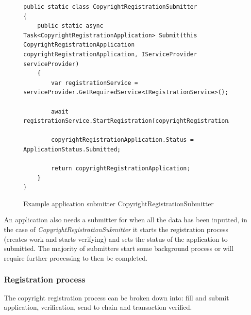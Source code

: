\begin{figure}[H]
\caption{Example application submitter \href{https://github.com/MrHarrisonBarker/CRPL/blob/main/CRPL.Web/Core/Applications/Submitters/CopyrightRegistrationSubmitter.cs}{CopyrightRegistrationSubmitter}}
\centering
\begin{lstlisting}[language=CSharp]
public static class CopyrightRegistrationSubmitter
{
    public static async Task<CopyrightRegistrationApplication> Submit(this CopyrightRegistrationApplication copyrightRegistrationApplication, IServiceProvider serviceProvider)
    {
        var registrationService = serviceProvider.GetRequiredService<IRegistrationService>();
        
        await registrationService.StartRegistration(copyrightRegistrationApplication);

        copyrightRegistrationApplication.Status = ApplicationStatus.Submitted;
        
        return copyrightRegistrationApplication;
    }
}
\end{lstlisting}
\end{figure}

An application also needs a submitter for when all the data has been inputted, in the case of \textit{CopyrightRegistrationSubmitter} it starts the registration process (creates work and starts verifying) and sets the status of the application to submitted. The majority of submitters start some background process or will require further processing to then be completed.

\subsubsection{Registration process}

The copyright registration process can be broken down into: fill and submit application, verification, send to chain and transaction verified.

